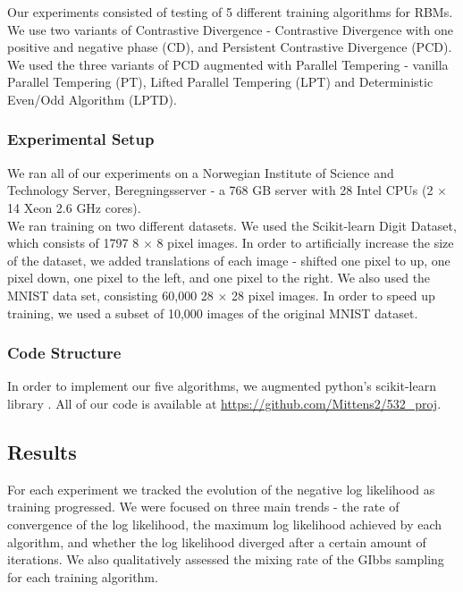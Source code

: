 Our experiments consisted of testing of 5 different training algorithms for RBMs. We use two variants of Contrastive Divergence  - Contrastive Divergence with one positive and negative phase (CD), and Persistent Contrastive Divergence (PCD). We used the three variants of PCD augmented with Parallel Tempering - vanilla Parallel Tempering (PT), Lifted Parallel Tempering (LPT) and Deterministic Even/Odd Algorithm (LPTD). \\

\subsubsection{Experimental Setup}
We ran all of our experiments on a Norwegian Institute of Science and Technology Server, Beregningsserver - a 768 GB server with 28 Intel CPUs (2 $\times$ 14 Xeon 2.6 GHz cores).\\

We ran training on two different datasets. We used the Scikit-learn Digit Dataset, which consists of 1797 8 $\times$ 8 pixel images. In order to artificially increase the size of the dataset, we added translations of each image - shifted one pixel to up, one pixel down, one pixel to the left, and one pixel to the right. We also used the MNIST data set, consisting 60,000 28 $\times$ 28 pixel images. In order to speed up training, we used a subset of 10,000 images of the original MNIST dataset.

\subsubsection{Code Structure}
In order to implement our five algorithms, we augmented python's scikit-learn library \cite{pedregosa2011scikit}. All of our code is available at \url{https://github.com/Mittens2/532_proj}.

\subsection{Results}
For each experiment we tracked the evolution of the negative log likelihood as training progressed. We were focused on three main trends - the rate of convergence of the log likelihood, the maximum log likelihood achieved by each algorithm, and whether the log likelihood diverged after a certain amount of iterations. We also qualitatively assessed the mixing rate of the GIbbs sampling for each training algorithm.\\

